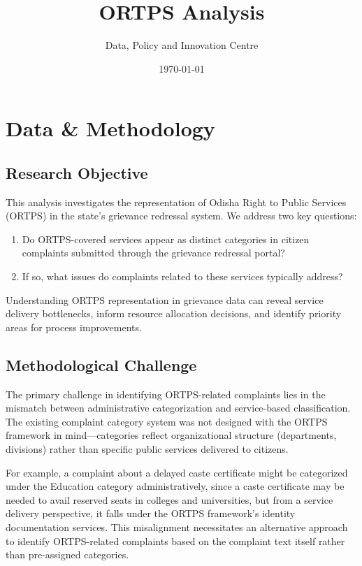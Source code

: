 \documentclass[11pt,a4paper]{article}
\title{ORTPS Analysis}
\author{Data, Policy and Innovation Centre}
\date{\today}
\begin{document}
\maketitle
\tableofcontents
\newpage

\listoftables
\listoffigures
\newpage

\section{Data \& Methodology}

\subsection{Research Objective}

This analysis investigates the representation of Odisha Right to Public Services (ORTPS) in the state's grievance redressal system. We address two key questions:
\begin{enumerate}
    \item Do ORTPS-covered services appear as distinct categories in citizen complaints submitted through the grievance redressal portal?
    \item If so, what issues do complaints related to these services typically address?
\end{enumerate}

Understanding ORTPS representation in grievance data can reveal service delivery bottlenecks, inform resource allocation decisions, and identify priority areas for process improvements.

\subsection{Methodological Challenge}

The primary challenge in identifying ORTPS-related complaints lies in the mismatch between administrative categorization and service-based classification. The existing complaint category system was not designed with the ORTPS framework in mind---categories reflect organizational structure (departments, divisions) rather than specific public services delivered to citizens.

For example, a complaint about a delayed caste certificate might be categorized under the Education category administratively, since a caste certificate may be needed to avail reserved seats in colleges and universities, but from a service delivery perspective, it falls under the ORTPS framework's identity documentation services. This misalignment necessitates an alternative approach to identify ORTPS-related complaints based on the complaint text itself rather than pre-assigned categories.
\end{document}
